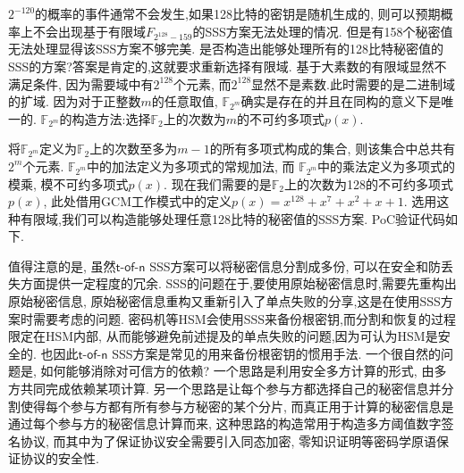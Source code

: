 \documentclass{article}
\newcommand{\F}{\mathbb{F}}
\begin{document}


$2^{-120}$的概率的事件通常不会发生,如果128比特的密钥是随机生成的,
则可以预期概率上不会出现基于有限域$F_{2^{128}-159}$的SSS方案无法处理的情况.
但是有158个秘密值无法处理显得该SSS方案不够完美.
是否构造出能够处理所有的128比特秘密值的SSS的方案?答案是肯定的,这就要求重新选择有限域.
基于大素数的有限域显然不满足条件, 因为需要域中有$2^{128}$个元素,
而$2^{128}$显然不是素数.此时需要的是二进制域的扩域.
因为对于正整数$m$的任意取值, $\F_{2^m}$确实是存在的并且在同构的意义下是唯一的. 
$\F_{2^m}$的构造方法:选择$\F_2$上的次数为$m$的不可约多项式$p(x)$.

将$\F_{2^m}$定义为$\F_2$上的次数至多为$m-1$的所有多项式构成的集合,
则该集合中总共有$2^m$个元素.  
$\F_{2^m}$中的加法定义为多项式的常规加法, 
而 $\F_{2^m}$中的乘法定义为多项式的模乘, 模不可约多项式$p(x)$. 
现在我们需要的是$\F_2$上的次数为128的不可约多项式$p(x)$,
此处借用GCM工作模式中的定义$p(x)=x^{128}+x^7+x^2+x+1$.
选用这种有限域,我们可以构造能够处理任意128比特的秘密值的SSS方案.
PoC验证代码如下.



值得注意的是, 虽然$\textsf{t-of-n}$ SSS方案可以将秘密信息分割成多份,
可以在安全和防丢失方面提供一定程度的冗余.
SSS的问题在于,要使用原始秘密信息时,需要先重构出原始秘密信息,
原始秘密信息重构又重新引入了单点失败的分享,这是在使用SSS方案时需要考虑的问题.
密码机等HSM会使用SSS来备份根密钥,而分割和恢复的过程限定在HSM内部,
从而能够避免前述提及的单点失败的问题,因为可认为HSM是安全的.
也因此$\textsf{t-of-n}$ SSS方案是常见的用来备份根密钥的惯用手法.
一个很自然的问题是, 如何能够消除对可信方的依赖?
一个思路是利用安全多方计算的形式, 由多方共同完成依赖某项计算.
另一个思路是让每个参与方都选择自己的秘密信息并分割使得每个参与方都有所有参与方秘密的某个分片,
而真正用于计算的秘密信息是通过每个参与方的秘密信息计算而来,
这种思路的构造常用于构造多方阈值数字签名协议, 而其中为了保证协议安全需要引入同态加密,
零知识证明等密码学原语保证协议的安全性.
\end{document}
